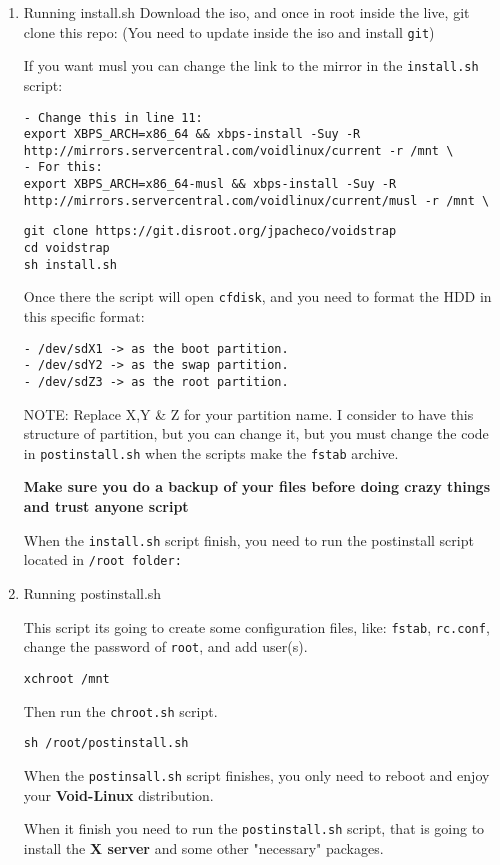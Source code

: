 \documentclass[11pt]{article}
\begin{document}
\begin{enumerate}
\item Running install.sh
\label{sec:org6aede61}
Download the iso, and once in root inside the live, git clone this repo:
(You need to update inside the iso and install \texttt{git})

If you want musl you can change the link to the mirror in the \texttt{install.sh} script:
\begin{verbatim}
- Change this in line 11:
export XBPS_ARCH=x86_64 && xbps-install -Suy -R http://mirrors.servercentral.com/voidlinux/current -r /mnt \
- For this:
export XBPS_ARCH=x86_64-musl && xbps-install -Suy -R http://mirrors.servercentral.com/voidlinux/current/musl -r /mnt \
\end{verbatim}

\begin{verbatim}
git clone https://git.disroot.org/jpacheco/voidstrap
cd voidstrap
sh install.sh
\end{verbatim}

Once there the script will open \texttt{cfdisk}, and you need to format the HDD in this 
specific format:
\begin{verbatim}
- /dev/sdX1 -> as the boot partition.
- /dev/sdY2 -> as the swap partition.
- /dev/sdZ3 -> as the root partition.
\end{verbatim}

NOTE: Replace X,Y \& Z for your partition name.
I consider to have this structure of partition, but you can change it, but you must
change the code in \texttt{postinstall.sh} when the scripts make the \texttt{fstab} archive.

\textbf{Make sure you do a backup of your files before doing crazy things and trust anyone script}

When the \texttt{install.sh} script finish, you need to run the postinstall script located in \texttt{/root folder:}
\item Running postinstall.sh
\label{sec:org2116f12}

This script its going to create some configuration files, like: \texttt{fstab}, \texttt{rc.conf},
change the password of \texttt{root}, and add user(s).

\begin{verbatim}
xchroot /mnt
\end{verbatim}

Then run the \texttt{chroot.sh} script.
\begin{verbatim}
sh /root/postinstall.sh
\end{verbatim}

When the \texttt{postinsall.sh} script finishes, you only need to reboot and enjoy your
\textbf{Void-Linux} distribution.

When it finish you need to run the \texttt{postinstall.sh} script, that is going to install
the \textbf{X server} and some other "necessary" packages.
\end{enumerate}
\end{document}
